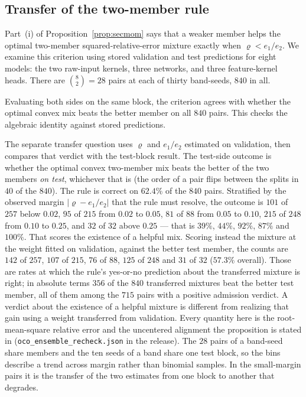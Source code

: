 \subsection{Transfer of the two-member rule}
\label{sec:secmom-margin}
Part~(i) of Proposition~\ref{prop:secmom} says that a weaker member helps
the optimal two-member squared-relative-error mixture exactly when
$\varrho<e_1/e_2$. We examine this criterion using stored
validation and test predictions for eight models: the two raw-input
kernels, three networks, and three feature-kernel heads. There are
$\binom{8}{2}=28$ pairs at each of thirty band-seeds, $840$ in all.

Evaluating both sides on the same block, the criterion agrees with whether
the optimal convex mix beats the better member on all $840$ pairs. This
checks the algebraic identity against stored predictions.

The separate transfer question uses $\varrho$ and $e_1/e_2$ estimated
on validation, then compares that verdict with the test-block result.
The test-side outcome is
whether the optimal convex two-member mix beats the better of the two members
\emph{on test}, whichever that is (the order of a pair flips between the
splits in $40$ of the $840$). The rule is correct on $62.4\%$ of the $840$
pairs. Stratified by the observed margin
$|\varrho-e_1/e_2|$ that the rule must resolve, the outcome is
$101$ of $257$ below $0.02$, $95$ of $215$ from $0.02$ to $0.05$, $81$ of
$88$ from $0.05$ to $0.10$, $215$ of $248$ from $0.10$ to $0.25$, and $32$
of $32$ above $0.25$ --- that is $39\%$, $44\%$, $92\%$, $87\%$ and
$100\%$. That scores the existence of a helpful mix. Scoring instead the
mixture at the weight fitted on validation, against the better test member,
the counts are $142$ of $257$, $107$ of $215$, $76$ of $88$,
$125$ of $248$ and $31$ of $32$ ($57.3\%$ overall). Those are rates at which
the rule's yes-or-no prediction about the transferred mixture is right; in
absolute terms $356$ of the $840$ transferred mixtures beat the better test
member, all of them among the $715$ pairs with a positive admission verdict.
A verdict about the existence of a helpful mixture is different from
realizing that gain using a weight transferred from validation. Every
quantity here is the root-mean-square relative error and
the uncentered alignment the proposition is stated in
(\texttt{oco\_ensemble\_recheck.json} in the release). The $28$ pairs of a band-seed share members and the ten seeds of a band
share one test block, so the bins describe a trend across margin rather
than binomial samples. In the small-margin pairs it is the transfer of the two estimates from one block to another that degrades.


